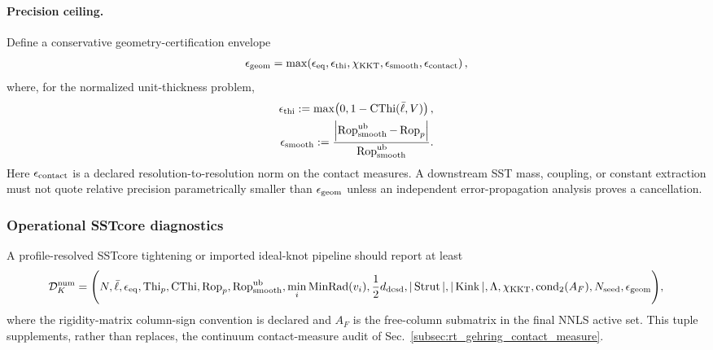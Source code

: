 \paragraph{Precision ceiling.}
Define a conservative geometry-certification envelope
\begin{align}
    \epsilon_{\rm geom}
    =
    \max\!\left(
        \epsilon_{\rm eq},
        \epsilon_{\rm thi},
        \chi_{\rm KKT},
        \epsilon_{\rm smooth},
        \epsilon_{\rm contact}
    \right),
    \label{eq:rt_geometry_precision_ceiling}
\end{align}
where, for the normalized unit-thickness problem,
\begin{align}
    \epsilon_{\rm thi}
    :=\max\!\left(0,1-\operatorname{CThi}(\bar\ell,V)\right),\\
    \epsilon_{\rm smooth}
    :=
    \frac{\left|\operatorname{Rop}_{\rm smooth}^{\rm ub}
    -\operatorname{Rop}_p\right|}
    {\operatorname{Rop}_{\rm smooth}^{\rm ub}} .
    \label{eq:rt_geometry_error_components}
\end{align}
Here $\epsilon_{\rm contact}$ is a declared resolution-to-resolution norm on
the contact measures.  A downstream SST mass, coupling, or constant extraction
must not quote relative precision parametrically smaller than
$\epsilon_{\rm geom}$ unless an independent error-propagation analysis proves
a cancellation.

\subsubsection{Operational SSTcore diagnostics}
A profile-resolved SSTcore tightening or imported ideal-knot pipeline should
report at least
\begin{align}
    \mathcal D_K^{\rm num}
    =
    \Bigg(
        N,
        \bar\ell,
        \epsilon_{\rm eq},
        \operatorname{Thi}_p,
        \operatorname{CThi},
        \operatorname{Rop}_p,
        \operatorname{Rop}_{\rm smooth}^{\rm ub},
        \min_i\operatorname{MinRad}(v_i),
        \frac12d_{\rm dcsd},
        |\operatorname{Strut}|,
        |\operatorname{Kink}|,
        \Lambda,
        \chi_{\rm KKT},
        \operatorname{cond}_2(A_F),
        N_{\rm seed},
        \epsilon_{\rm geom}
    \Bigg),
    \label{eq:rt_sstcore_contact_diagnostics}
\end{align}
where the rigidity-matrix column-sign convention is declared and $A_F$ is the
free-column submatrix in the final NNLS active set.  This tuple supplements,
rather than replaces, the continuum contact-measure audit of
Sec.~\ref{subsec:rt_gehring_contact_measure}.

